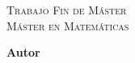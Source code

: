 


\begin{comment}
\usepackage{emptypage}
\renewcommand{\shorthandsspanish}{}
\usepackage[usenames,dvipsnames]{color}
\usepackage[dvipsnames]{xcolor}
\usepackage{multicol}
\usepackage{fancyhdr}
\usepackage{blindtext}
\usepackage{latexsym} 
\usepackage{amsmath}
\usepackage{amssymb}
\usepackage{graphicx}
\usepackage{subfigure}
\usepackage{fourier}
\end{comment}



\begin{titlepage}
	
\AddToShipoutPicture*{\BackgroundPic}
	
	\newlength{\centeroffset}
	\setlength{\centeroffset}{-0.5\oddsidemargin}
	\addtolength{\centeroffset}{0.5\evensidemargin}
	\thispagestyle{empty}

\vspace*{4cm}

	\noindent\hspace*{\centeroffset}\begin{minipage}{\textwidth}
		
		\centering
		
		\textsc{ \huge Trabajo Fin de Máster\\[0.2cm]}
		\medskip
		\textsc{ \Large Máster en Matemáticas}\\[0.8cm]
		
		{\Huge\bfseries \makeatletter \@title \makeatother
		}
		
	\end{minipage}

	\vspace{2cm}
	\noindent\hspace*{\centeroffset}\begin{minipage}{\textwidth}
		\centering
		\textbf{\large Autor}\\ {\Large \makeatletter \@author \makeatother}\\[5.5ex]
	\end{minipage}
	

\end{titlepage}
